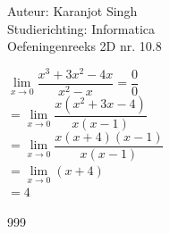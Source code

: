 \documentclass[a4paper]{article}
\newcommand{\llim}{\lim\limits}
\begin{document}
	
	\noindent \large Auteur: Karanjot Singh \\
	\noindent \large Studierichting: Informatica\\
	\noindent \large Oefeningenreeks 2D nr. 10.8\\
	
	\medskip
	
	\normalsize
	
	$\llim_{x \to 0} \dfrac{x^3 + 3x^2 - 4x}{x^2 - x} = \dfrac{0}{0}$\\
	
	$  = \llim_{x \to 0} \dfrac{x(x^2 + 3x - 4)}{x(x - 1)}$\\
	
	$  = \llim_{x \to 0} \dfrac{x(x + 4)(x - 1)}{x(x - 1)} $\\
	
	$ = \llim_{x \to 0} (x + 4)$\\
	
	$ = 4$\\
	
	\begin{thebibliography}{999}
	\end{thebibliography}
\end{document}
